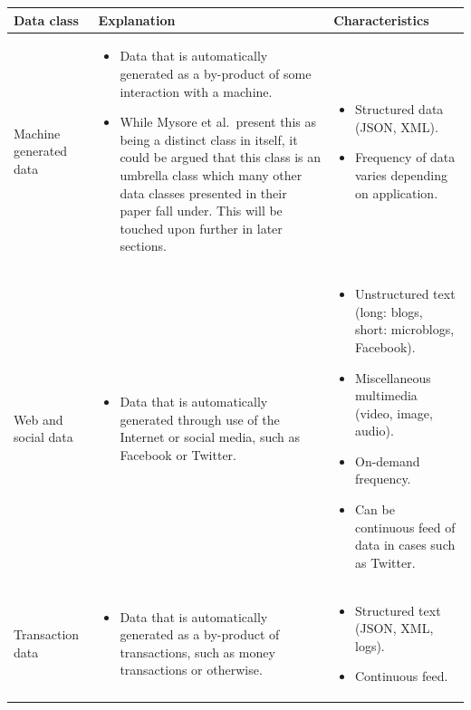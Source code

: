 \documentclass[a4paper,11pt]{article}
\begin{document}
\hspace*{-3cm}
\begingroup
\fontsize{8pt}{10pt}\selectfont
\begin{tabular}{ | p{1.5cm} | p{8cm} | p{8cm} | }
\hline
\textbf{Data class}          &  \textbf{Explanation} & \textbf{Characteristics}   \\ \hline

Machine generated data
&
\begin{itemize}
  \item Data that is automatically generated as a by-product of some interaction with a machine.
  \item While Mysore et al.\ present this as being a distinct class in itself, it could be argued that this class
  is an umbrella class which many other data classes presented in their paper fall under. This will be touched upon
  further in later sections.
\end{itemize}
&
\begin{itemize}
  \item Structured data (JSON, XML).
  \item Frequency of data varies depending on application.
\end{itemize}
\\ \hline

Web and social data
&
\begin{itemize}
  \item Data that is automatically generated through use of the Internet or social media, such as Facebook or Twitter.
\end{itemize}
&
\begin{itemize}
  \item Unstructured text (long: blogs, short: microblogs, Facebook).
  \item Miscellaneous multimedia (video, image, audio).
  \item On-demand frequency.
  \item Can be continuous feed of data in cases such as Twitter.
\end{itemize}
\\ \hline

Transaction data
&
\begin{itemize}
  \item Data that is automatically generated as a by-product of transactions, such as money transactions or otherwise.
\end{itemize}
&
\begin{itemize}
  \item Structured text (JSON, XML, logs).
  \item Continuous feed.
\end{itemize}
\\ \hline


\end{tabular}
\end{document}
